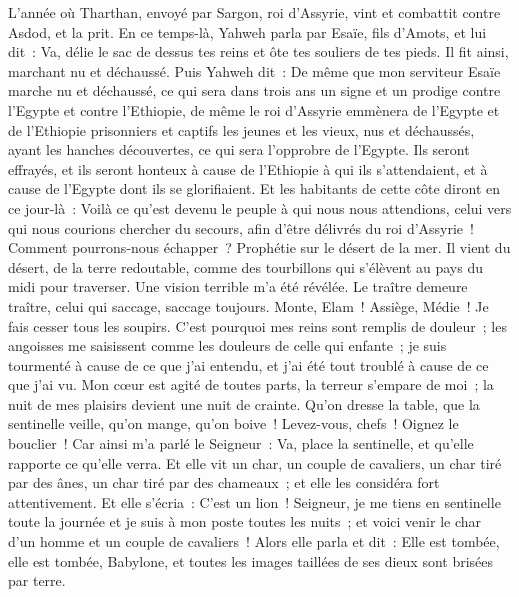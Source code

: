 \begin{multicols}{2}
\VerseOne{}L'année où Tharthan, envoyé par Sargon, roi d'Assyrie, vint et combattit contre Asdod, et la prit.
En ce temps-là, Yahweh parla par Esaïe, fils d'Amots, et lui dit~: Va, délie le sac de dessus tes reins et ôte tes souliers de tes pieds. Il fit ainsi, marchant nu et déchaussé.
Puis Yahweh dit~: De même que mon serviteur Esaïe marche nu et déchaussé, ce qui sera dans trois ans un signe et un prodige contre l'Egypte et contre l'Ethiopie,
de même le roi d'Assyrie emmènera de l'Egypte et de l'Ethiopie prisonniers et captifs les jeunes et les vieux, nus et déchaussés, ayant les hanches découvertes, ce qui sera l'opprobre de l'Egypte.
Ils seront effrayés, et ils seront honteux à cause de l'Ethiopie à qui ils s'attendaient, et à cause de l'Egypte dont ils se glorifiaient.
Et les habitants de cette côte diront en ce jour-là~: Voilà ce qu'est devenu le peuple à qui nous nous attendions, celui vers qui nous courions chercher du secours, afin d'être délivrés du roi d'Assyrie~! Comment pourrons-nous échapper~?
\VerseOne{}Prophétie sur le désert de la mer. Il vient du désert, de la terre redoutable, comme des tourbillons qui s'élèvent au pays du midi pour traverser.
Une vision terrible m'a été révélée. Le traître demeure traître, celui qui saccage, saccage toujours. Monte, Elam~! Assiège, Médie~! Je fais cesser tous les soupirs.
C'est pourquoi mes reins sont remplis de douleur~; les angoisses me saisissent comme les douleurs de celle qui enfante~; je suis tourmenté à cause de ce que j'ai entendu, et j'ai été tout troublé à cause de ce que j'ai vu.
Mon cœur est agité de toutes parts, la terreur s'empare de moi~; la nuit de mes plaisirs devient une nuit de crainte.
Qu'on dresse la table, que la sentinelle veille, qu'on mange, qu'on boive~! Levez-vous, chefs~! Oignez le bouclier~!
Car ainsi m'a parlé le Seigneur~: Va, place la sentinelle, et qu'elle rapporte ce qu'elle verra.
Et elle vit un char, un couple de cavaliers, un char tiré par des ânes, un char tiré par des chameaux~; et elle les considéra fort attentivement.
Et elle s'écria~: C'est un lion~! Seigneur, je me tiens en sentinelle toute la journée et je suis à mon poste toutes les nuits~;
et voici venir le char d'un homme et un couple de cavaliers~! Alors elle parla et dit~: Elle est tombée, elle est tombée, Babylone, et toutes les images taillées de ses dieux sont brisées par terre.

\end{multicols}
